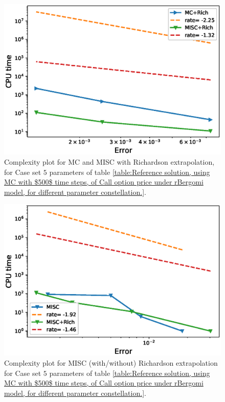 \documentclass[11pt]{article}
\begin{document}
\begin{figure}[h!]
	\centering
	\includegraphics[width=0.7\linewidth]{./figures/rBergomi_Complexity_rates/set5/error_vs_time_set5_rich}
	
	\caption{Complexity plot for  MC and MISC with Richardson extrapolation, for Case set $5$ parameters of table \ref{table:Reference solution, using MC with $500$ time steps, of Call option price under rBergomi model, for different parameter constellation.}.}
	\label{fig:Complexity plot for MC and MISC for Case set $5$ parameters, richardson}
\end{figure}


	\begin{figure}[h!]
	\centering
	\includegraphics[width=0.7\linewidth]{./figures/rBergomi_Complexity_rates/set5/error_vs_time_set5_comparison}
	
	\caption{Complexity plot for  MISC (with/without) Richardson extrapolation for Case set $5$ parameters of table \ref{table:Reference solution, using MC with $500$ time steps, of Call option price under rBergomi model, for different parameter constellation.}.}
	\label{fig:Complexity plot for  MISC for Case set $5$ parameters, comparison}
\end{figure}
\end{document}
